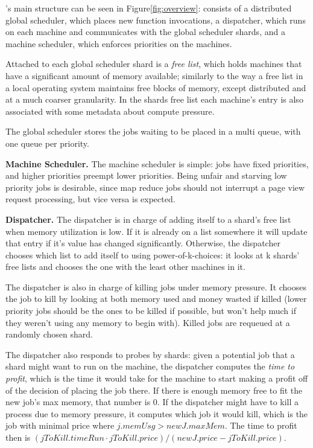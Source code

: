 \sys{}'s main structure can be seen in Figure\ref{fig:overview}: \sys{} consists
of a distributed global scheduler, which places new function invocations, a
dispatcher, which runs on each machine and communicates with the global
scheduler shards, and a machine scheduler, which enforces priorities on the
machines.

Attached to each global scheduler shard is a \textit{free list}, which holds
machines that have a significant amount of memory available; similarly to the
way a free list in a local operating system maintains free blocks of memory,
except distributed and at a much coarser granularity. In the shards free list
each machine's entry is also associated with some metadata about compute
pressure.

The global scheduler stores the jobs waiting to be placed in a multi queue, with
one queue per priority.


\textbf{Machine Scheduler.}
The machine scheduler is simple: jobs have fixed priorities, and higher
priorities preempt lower priorities. Being unfair and starving low priority
jobs is desirable, since map reduce jobs should not interrupt a page view
request processing, but vice versa is expected.


\textbf{Dispatcher.}
The dispatcher is in charge of adding itself to a shard's free list when memory
utilization is low. If it is already on a list somewhere it will update that
entry if it's value has changed significantly. Otherwise, the dispatcher chooses
which list to add itself to using power-of-k-choices: it looks at k shards' free
lists and chooses the one with the least other machines in it. 

The dispatcher is also in charge of killing jobs under memory pressure. It
chooses the job to kill by looking at both memory used and money wasted if
killed (lower priority jobs should be the ones to be killed if possible, but
won't help much if they weren't using any memory to begin with). Killed jobs are
requeued at a randomly chosen shard.

The dispatcher also responds to probes by shards: given a potential job that a
shard might want to run on the machine, the dispatcher computes the \textit{time
to profit}, which is the time it would take for the machine to start making a
profit off of the decision of placing the job there. If there is enough memory
free to fit the new job's max memory, that number is 0. If the dispatcher might
have to kill a process due to memory pressure, it computes which job it would
kill, which is the job with minimal price where $j.memUsg > newJ.maxMem$. The
time to profit then is $(jToKill.timeRun \cdot jToKill.price) / (newJ.price
- jToKill.price)$.


